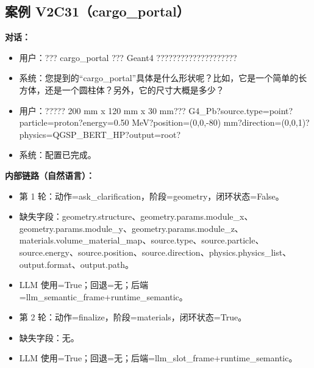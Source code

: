 \documentclass[11pt]{ctexart}
\begin{document}
\subsection{案例 V2C31（cargo\_portal）}
\textbf{对话：}
\begin{itemize}
\item 用户：??? cargo\_portal ??? Geant4 ????????????????????
\item 系统：您提到的“cargo\_portal”具体是什么形状呢？比如，它是一个简单的长方体，还是一个圆柱体？另外，它的尺寸大概是多少？
\item 用户：????? 200 mm x 120 mm x 30 mm??? G4\_Pb?source.type=point?particle=proton?energy=0.50 MeV?position=(0,0,-80) mm?direction=(0,0,1)?physics=QGSP\_BERT\_HP?output=root?
\item 系统：配置已完成。
\end{itemize}
\textbf{内部链路（自然语言）：}
\begin{itemize}
\item 第 1 轮：动作=ask\_clarification，阶段=geometry，闭环状态=False。
\item 缺失字段：geometry.structure、geometry.params.module\_x、geometry.params.module\_y、geometry.params.module\_z、materials.volume\_material\_map、source.type、source.particle、source.energy、source.position、source.direction、physics.physics\_list、output.format、output.path。
\item LLM 使用=True；回退=无；后端=llm\_semantic\_frame+runtime\_semantic。
\item 第 2 轮：动作=finalize，阶段=materials，闭环状态=True。
\item 缺失字段：无。
\item LLM 使用=True；回退=无；后端=llm\_slot\_frame+runtime\_semantic。
\end{itemize}
\end{document}
